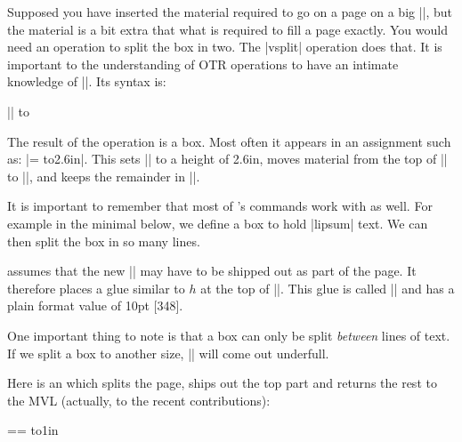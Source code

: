 \begin{multicols}{2}
Supposed you have inserted the material required to go on a page on a big |\vbox|, but the material is a bit extra that what is required to fill a page exactly. You would need an operation to split the box in two. The |vsplit| operation does that. It is important to the understanding of OTR operations to have an intimate knowledge of |\vsplit|. Its syntax is: 

|\vsplit| to 

The result of the operation is a box. Most often it appears in an assignment such as: |= to2.6in|. This sets || to a
height of 2.6in, moves material from the top of
|| to ||, and keeps the remainder in ||.

It is important to remember that most of \tex's commands work with \latex as well. For example in the minimal below, we define a box to hold |lipsum| text. We can then split the box in so many lines.



\tex assumes that the new || may have to
be shipped out as part of the page. It therefore
places a glue similar to $h$ at the top of ||.
This glue is called |\splittopskip| and has a plain
format value of 10pt [348].

One important thing to note is that a box can only be split \textit{between} lines of text. 
If we split a box to another size, || will come out underfull.

Here is an \otr which splits the page, ships
out the top part and returns the rest to the MVL
(actually, to the recent contributions):

\begin{Code}
\output={= to1in
\shipout{} }
\end{Code}


\end{multicols}



